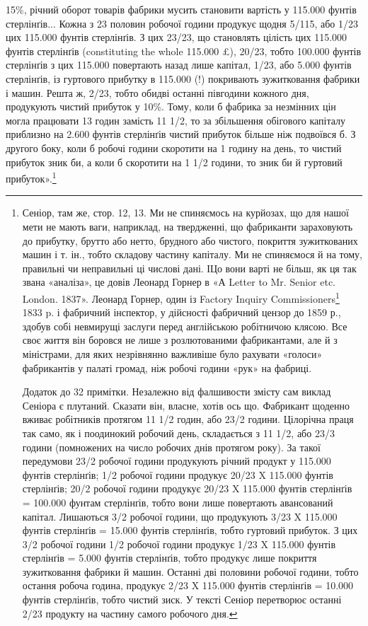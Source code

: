 \parcont{}  %
15\%, річний оборот товарів фабрики мусить становити вартість у 115.000 фунтів стерлінґів... Кожна з
23 половин робочої години продукує щодня 5/115, або 1/23 цих 115.000 фунтів стерлінґів. З цих 23/23,
що становлять цілість цих 115.000 фунтів стерлінґів (constituting the whole 115.000 £), 20/23, тобто
100.000 фунтів стерлінґів з цих 115.000 повертають назад лише капітал, 1/23, або 5.000 фунтів
стерлінґів, із гуртового прибутку в 115.000 (!) покривають зужитковання фабрики і машин. Решта ж,
2/23, тобто обидві останні півгодини кожного дня, продукують чистий прибуток
у 10\%. Тому, коли б фабрика за незмінних цін могла працювати 13 годин замість 11 1/2, то за
збільшення обігового
капіталу приблизно на 2.600 фунтів стерлінґів чистий прибуток більше ніж подвоївся б. З другого
боку, коли б робочі години скоротити на 1 годину на день, то чистий прибуток зник би, а коли б
скоротити на 1 1/2 години, то зник би й гуртовий прибуток».\footnote{
Сеніор, там же, стор. 12, 13. Ми не спиняємось на курйозах, що для нашої мети не мають ваги,
наприклад, на твердженні, що фабриканти зараховують до прибутку, брутто або нетто, брудного або
чистого, покриття зужиткованих машин і т. ін., тобто складову частину капіталу. Ми не
спиняємося й на тому, правильні чи неправильні ці числові дані. ІЦо вони
варті не більш, як ця так звана «аналіза», це довів Леонард Горнер в «А Letter to Mr. Senior etc.
London. 1837». Леонард Горнер, один із Factory Inquiry Commissioners\footnote*{
— членів комісії для розсліду відносин по фабриках. Ред.
} 1833 p. і фабричний
інспектор, у дійсності
фабричний цензор до 1859 р., здобув собі невмирущі заслуги перед англійською робітничою клясою. Все
своє життя він боровся не лише з розлютованими фабрикантами, але й з міністрами, для яких
незрівнянно важливіше було рахувати «голоси» фабрикантів у палаті громад, ніж
робочі години «рук» на фабриці.

Додаток до 32 примітки. Незалежно від фалшивости змісту сам виклад Сеніора є плутаний. Сказати він,
власне, хотів ось що. Фабрикант щоденно вживає робітників протягом 11 1/2 годин, або 23/2 години.
Цілорічна праця так само, як і поодинокий робочий день, складається з 11 1/2,
або 23/3 години (помножених на число робочих днів протягом року). За такої передумови 23/2 робочої
години продукують річний продукт у 115.000 фунтів стерлінґів; 1/2 робочої години продукує 20/23 X
115.000 фунтів стерлінґів; 20/2 робочої години продукує 20/23 X 115.000 фунтів стерлінґів = 100.000
фунтам стерлінґів, тобто вони лише повертають
авансований капітал. Лишаються 3/2 робочої години, що продукують 3/23 X 115.000 фунтів стерлінґів =
15.000 фунтів стерлінґів, тобто гуртовий прибуток. З цих 3/2 робочої години 1/2 робочої години
продукує 1/23 X 115.000 фунтів стерлінґів = 5.000 фунтів стерлінґів, тобто продукує
лише покриття зужитковання фабрики й машин. Останні дві половини робочої години, тобто остання
робоча година, продукує 2/23 X 115.000 фунтів стерлінґів = 10.000 фунтів стерлінґів, тобто чистий
зиск.
У тексті Сеніор перетворює останні 2/23 продукту на частину самого робочого
дня.
}

